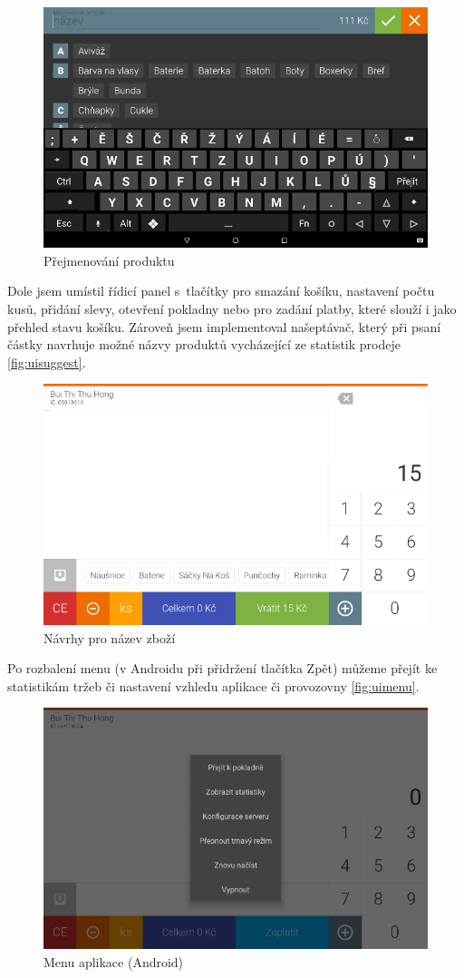 \documentclass[a4paper,11pt,oneside]{article}
\begin{document}
\begin{figure}[H]
	\centering
	\includegraphics[width=0.7\linewidth]{../ui_keyboard}
	\caption{Přejmenování produktu}
	\label{fig:uikeyboard}
\end{figure}


Dole jsem umístil řídicí panel s~tlačítky pro smazání košíku, nastavení počtu kusů, přidání slevy, otevření pokladny nebo pro zadání platby, které slouží i jako přehled stavu košíku. Zároveň jsem implementoval našeptávač, který při psaní částky navrhuje možné názvy produktů vycházející ze statistik prodeje \eqref{fig:uisuggest}.

\begin{figure}[H]
	\centering
	\includegraphics[width=0.7\linewidth]{../ui_suggest}
	\caption{Návrhy pro název zboží}
	\label{fig:uisuggest}
\end{figure}


Po rozbalení menu (v Androidu při přidržení tlačítka Zpět) můžeme přejít ke statistikám tržeb či nastavení vzhledu aplikace či provozovny \eqref{fig:uimenu}.

\begin{figure}[H]
	\centering
	\includegraphics[width=0.7\linewidth]{../ui_menu}
	\caption{Menu aplikace (Android)}
	\label{fig:uimenu}
\end{figure}
\end{document}
